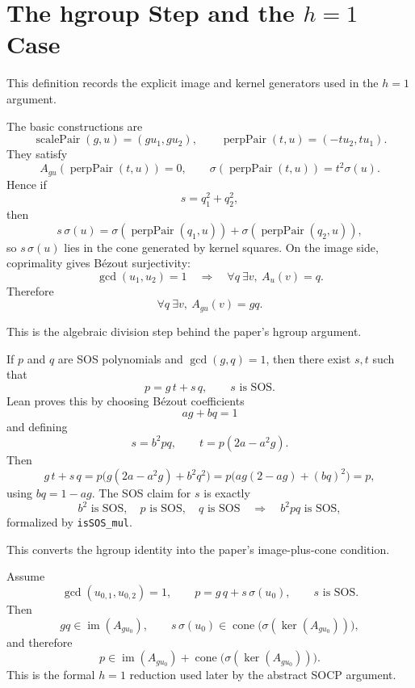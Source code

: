 \section{The hgroup Step and the \texorpdfstring{$h=1$}{h=1} Case}

This definition records the explicit image and kernel generators used in the
$h=1$ argument.
\begin{definition}\label{def:h1-machinery}
\leanok
The basic constructions are
\[
\operatorname{scalePair}(g,u)=(g u_1,g u_2),
\qquad
\operatorname{perpPair}(t,u)=(-t u_2,t u_1).
\]
They satisfy
\[
A_{g u}(\operatorname{perpPair}(t,u))=0,
\qquad
\sigma(\operatorname{perpPair}(t,u))=t^2 \sigma(u).
\]
Hence if
\[
s=q_1^2+q_2^2,
\]
then
\[
s\,\sigma(u)=\sigma(\operatorname{perpPair}(q_1,u))
            +\sigma(\operatorname{perpPair}(q_2,u)),
\]
so $s\,\sigma(u)$ lies in the cone generated by kernel squares. On the image
side, coprimality gives Bézout surjectivity:
\[
\gcd(u_1,u_2)=1
\quad\Longrightarrow\quad
\forall q\ \exists v,\ A_u(v)=q.
\]
Therefore
\[
\forall q\ \exists v,\ A_{g u}(v)=gq.
\]
\end{definition}

This is the algebraic division step behind the paper's hgroup argument.
\begin{lemma}\label{lem:hgroup}
\leanok
If $p$ and $q$ are SOS polynomials and $\gcd(g,q)=1$, then there exist $s,t$
such that
\[
p = g\,t + s\,q,
\qquad
s \text{ is SOS}.
\]
Lean proves this by choosing Bézout coefficients
\[
ag+bq=1
\]
and defining
\[
s=b^2 p q,
\qquad
t=p(2a-a^2 g).
\]
Then
\[
g\,t+s\,q
=p\bigl(g(2a-a^2g)+b^2 q^2\bigr)
=p\bigl(ag(2-ag)+(bq)^2\bigr)
=p,
\]
using $bq=1-ag$. The SOS claim for $s$ is exactly
\[
b^2 \text{ is SOS},\quad p \text{ is SOS},\quad q \text{ is SOS}
\quad\Longrightarrow\quad
b^2 p q \text{ is SOS},
\]
formalized by \texttt{isSOS\_mul}.
\end{lemma}

This converts the hgroup identity into the paper's image-plus-cone condition.
\begin{proposition}\label{prop:h1}
\leanok
Assume
\[
\gcd(u_{0,1},u_{0,2})=1,
\qquad
p = g\,q + s\,\sigma(u_0),
\qquad
s \text{ is SOS}.
\]
Then
\[
gq \in \operatorname{im}(A_{g u_0}),
\qquad
s\,\sigma(u_0)\in
\operatorname{cone}\bigl(\sigma(\ker(A_{g u_0}))\bigr),
\]
and therefore
\[
p \in \operatorname{im}(A_{g u_0}) +
\operatorname{cone}\bigl(\sigma(\ker(A_{g u_0}))\bigr).
\]
This is the formal $h=1$ reduction used later by the abstract SOCP argument.
\end{proposition}

